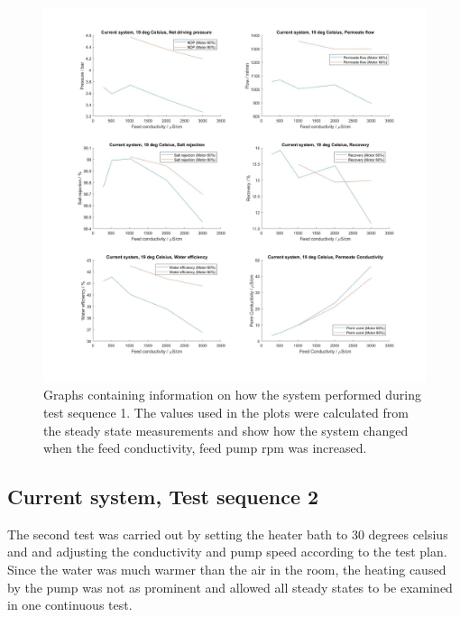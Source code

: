 \begin{figure}[H]
    \centering
    \includegraphics[width=1\textwidth]{Key20}
    \caption{Graphs containing information on how the system performed during test sequence 1. The values used in the plots were calculated from the steady state measurements and show how the system changed when the feed conductivity, feed pump rpm was increased.}
    \label{fig:K20}
\end{figure}

\newpage

\subsection{Current system, Test sequence 2}

The second test was carried out by setting the heater bath to 30 degrees celsius and and adjusting the conductivity and pump speed according to the test plan. Since the water was much warmer than the air in the room, the heating caused by the pump was not as prominent and allowed all steady states to be examined in one continuous test. 

